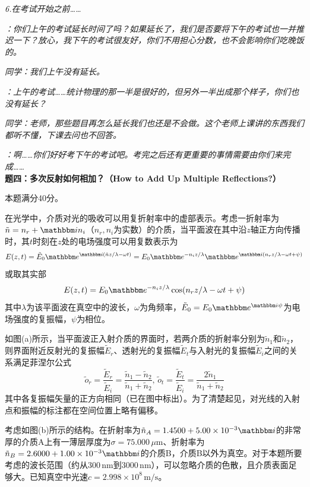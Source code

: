 \documentclass[11pt,a4paper,onecolumn,UTF8]{ctexart}
\begin{document}
	
	\textit{6.在考试开始之前……}
	
	\textit{：你们上午的考试延长时间了吗？如果延长了，我们是否要将下午的考试也一并推迟一下？放心，我下午的考试很友好，你们不用担心分数，也不会影响你们吃晚饭的。}
	
	\textit{同学：我们上午没有延长。}
	
	\textit{：上午的考试……统计物理的那一半是很好的，但另外一半出成那个样子，你们也没有延长？}
	
	\textit{同学：老师，那些题目再怎么延长我们也还是不会做。这个老师上课讲的东西我们都听不懂，下课去问也不回答。}
	
	\textit{：啊……你们好好考下午的考试吧。考完之后还有更重要的事情需要由你们来完成……}\\
	
	\noindent
	\textbf{题四：多次反射如何相加？（How to Add Up Multiple Reflections?）}
	
	本题满分40分。
	
	在光学中，介质对光的吸收可以用复折射率中的虚部表示。考虑一折射率为$\tilde{n}=n_r+\ui n_i$（$n_r,n_i$为实数）的介质，当平面波在其中沿$z$轴正方向传播时，其$t$时刻在$z$处的电场强度可以用复数表示为
	\begin{equation*}
		E(z,t)=\tilde E_0\ue^{\ui(\tilde{n}z/\lambda-\omega t)}=E_0\ue^{-n_iz/\lambda}\ue^{\ui(n_rz/\lambda-\omega t+\psi)}
	\end{equation*}
	或取其实部
	\begin{equation*}
		E(z,t)=E_0\ue^{-n_iz/\lambda}\cos(n_rz/\lambda-\omega t+\psi)
	\end{equation*}
	其中$\lambda$为该平面波在真空中的波长，$\omega$为角频率，$\tilde E_0=E_0\ue^{\ui\psi}$为电场强度的复振幅，$\psi$为相位。
	
	如图(a)所示，当平面波正入射介质的界面时，若两介质的折射率分别为$\tilde n_1$和$\tilde n_2$，则界面附近反射光的复振幅$\tilde E_r$、透射光的复振幅$\tilde E_t$与入射光的复振幅$\tilde E_i$之间的关系满足菲涅尔公式
	\begin{equation*}
		\tilde o_r=\frac{\tilde E_r}{\tilde E_i}=\frac{\tilde n_1-\tilde n_2}{\tilde n_1+\tilde n_2},\,\tilde o_t=\frac{\tilde E_t}{\tilde E_i}=\frac{2\tilde n_1}{\tilde n_1+\tilde n_2}
	\end{equation*}
	其中各复振幅矢量的正方向相同（已在图中标出）。为了清楚起见，对光线的入射点和振幅的标注都在空间位置上略有偏移。
	
	考虑如图(b)所示的结构。在折射率为$\tilde n_A=1.4500+5.00\times10^{-3}\ui$的非常厚的介质A上有一薄层厚度为$\sigma=75.000\,\mu\text{m}$、折射率为$\tilde n_B=2.6000+1.00\times10^{-3}\ui$的介质B，介质B以外为真空。对于本题所要考虑的波长范围（约从$300\,\text{nm}$到$3000\,\text{nm}$），可以忽略介质的色散，且介质表面足够大。已知真空中光速$c=2.998\times10^8\,\text{m/s}$。
	
\end{document}
